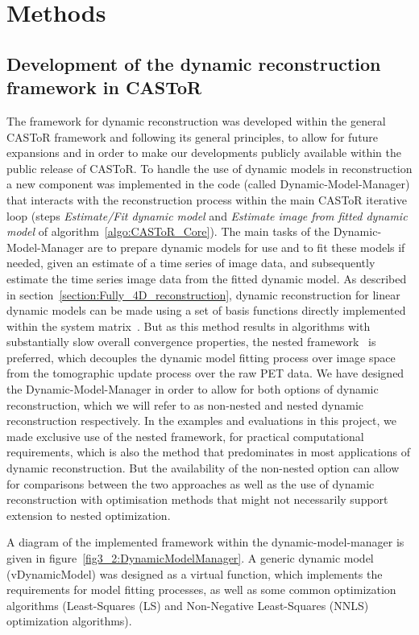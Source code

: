 \section{Methods}

\subsection{Development of the dynamic reconstruction framework in CASToR}
The framework for dynamic reconstruction was developed within the general CASToR framework and following its general principles, to allow for future expansions and in order to make our developments publicly available within the public release of CASToR.
To handle the use of dynamic models in reconstruction a new component was implemented in the code (called Dynamic-Model-Manager) that interacts with the reconstruction process within the main CASToR iterative loop (steps \textit{Estimate/Fit dynamic model} and \textit{Estimate image from fitted dynamic model} of algorithm~\ref{algo:CASToR_Core}). 
The main tasks of the Dynamic-Model-Manager are to prepare dynamic models for use and to fit these models if needed, given an estimate of a time series of image data, and subsequently estimate the time series image data from the fitted dynamic model. 
As described in section~\ref{section:Fully_4D_reconstruction}, dynamic reconstruction for linear dynamic models can be made using a set of basis functions directly implemented within the system matrix~\cite{Matthews1995,Wang2008,Reader2014}. But as this method results in algorithms with substantially slow overall convergence properties, the nested framework~\cite{Wang2010,Matthews2010} is preferred, which decouples the dynamic model fitting process over image space from the tomographic update process over the raw PET data.
We have designed the Dynamic-Model-Manager in order to allow for both options of dynamic reconstruction, which we will refer to as non-nested and nested dynamic reconstruction respectively.
In the examples and evaluations in this project, we made exclusive use of the nested framework, for practical computational requirements, which is also the method that predominates in most applications of dynamic reconstruction. But the availability of the non-nested option can allow for comparisons between the two approaches as well as the use of dynamic reconstruction with optimisation methods that might not necessarily support extension to nested optimization.

A diagram of the implemented framework within the dynamic-model-manager is given in figure~\ref{fig3_2:DynamicModelManager}. 
A generic dynamic model (vDynamicModel) was designed as a virtual function, which implements the requirements for model fitting processes, as well as some common optimization algorithms (Least-Squares (LS) and Non-Negative Least-Squares (NNLS) optimization algorithms).

